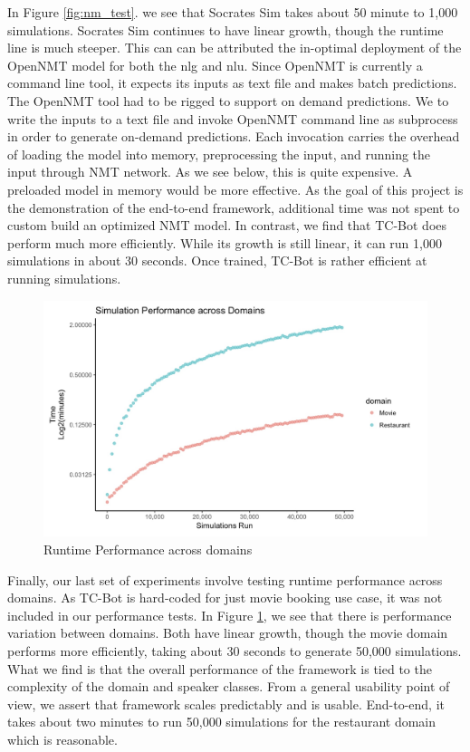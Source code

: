 In Figure \ref{fig:nm_test}. we see that Socrates Sim takes about 50 minute to 1,000 simulations. Socrates Sim continues to have linear growth, though the runtime line is much steeper. This can can be attributed the in-optimal deployment of the OpenNMT model for both the nlg and nlu. Since OpenNMT is currently a command line tool, it expects its inputs as text file and makes batch predictions. The OpenNMT tool had to be rigged to support on demand predictions. We to write the inputs to a text file and  invoke OpenNMT command line as subprocess in order to generate on-demand predictions. Each invocation carries the overhead of loading the model into memory, preprocessing the input, and running the input through NMT network. As we see below, this is quite expensive. A preloaded model in memory would be more effective. As the goal of this project is the demonstration of the end-to-end framework, additional time was not spent to custom build an optimized NMT model. In contrast, we find that TC-Bot does perform much more efficiently. While its growth is still linear, it can run 1,000 simulations in about 30 seconds. Once trained, TC-Bot is rather efficient at running simulations. 

 \begin{figure}[h!]
	\label{fig:perf_cd_test}
	\includegraphics[width=\linewidth]{diagrams/domain_perf.jpeg}
	\caption{ Runtime Performance across domains}
\end{figure}

 Finally, our last set of experiments involve testing runtime performance across domains. As TC-Bot is hard-coded for just movie booking use case, it was not included in our performance tests. In Figure \ref{fig:perf_cd_test}, we see that there is performance variation between domains. Both have linear growth, though the movie domain performs more efficiently, taking about 30 seconds to generate 50,000 simulations. What we find is that the overall performance of the framework is tied to the complexity of the domain and speaker classes. From a general usability point of view, we assert that framework scales predictably and is usable. End-to-end, it takes about two minutes to run 50,000 simulations for the restaurant domain which is reasonable. 
 
